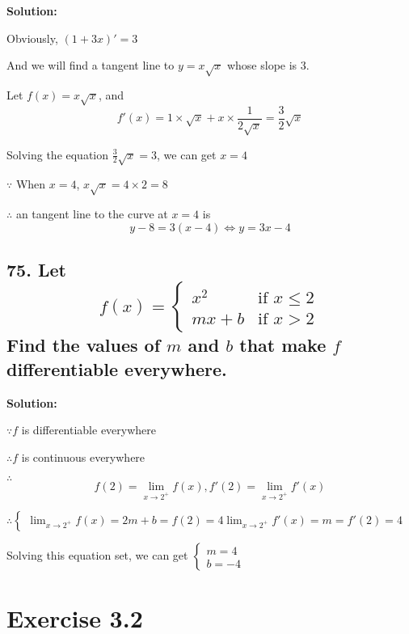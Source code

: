 \documentclass{article}
\newenvironment{solution}{
    \par \textbf{Solution: } \quad \par
}{\par}
\begin{document}
    \begin{solution}
        Obviously, $(1 + 3x)' = 3$
        
        And we will find a tangent line to $y = x\sqrt x$ whose slope is $3$.

        Let $f(x) = x\sqrt x$, and $$f'(x) = 1 \times \sqrt x + x \times \frac{1}{2\sqrt x} = \frac 3 2 \sqrt x $$

        Solving the equation $\frac 3 2 \sqrt x = 3$, we can get $x = 4$

        $\because$ When $x = 4$, $x\sqrt x = 4 \times 2 = 8$

        $\therefore$ an tangent line to the curve at $x = 4$ is $$y - 8 = 3(x - 4) \iff y = 3x - 4$$

    \end{solution}

    \subsection*{75. Let $$f(x) = \left\{ \begin{array}{ll}
        x^2 & \textrm{if $x \leq 2$} \\
        mx + b & \textrm{if $x > 2$}
    \end{array} \right.$$ Find the values of $m$ and $b$ that make $f$ differentiable everywhere.}

    \begin{solution}
        $\because f$ is differentiable everywhere
        
        $\therefore f $ is continuous everywhere

        $\therefore$ $$f(2) = \lim_{x \to 2^+}f(x), f'(2) = \lim_{x \to 2^+}f'(x)$$

        $\therefore \left \{ \begin{array}{ll}
            \lim_{x \to 2^+}f(x) = 2m + b = f(2) = 4
            \lim_{x \to 2^+}f'(x) = m = f'(2) = 4
        \end{array} \right.$

        Solving this equation set, we can get $\left \{ \begin{array}{ll}
            m = 4 \\ b = -4
        \end{array} \right.$

    \end{solution}

    \section*{Exercise 3.2}
\end{document}
